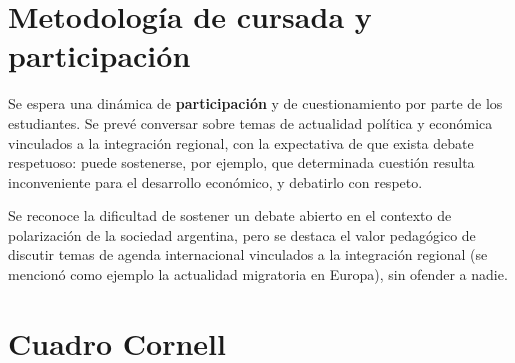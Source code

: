 \documentclass[12pt,oneside]{book}
\begin{document}
\section{Metodología de cursada y participación}

Se espera una dinámica de \textbf{participación} y de cuestionamiento por parte de los estudiantes. Se prevé conversar sobre temas de actualidad política y económica vinculados a la integración regional, con la expectativa de que exista debate respetuoso: puede sostenerse, por ejemplo, que determinada cuestión resulta inconveniente para el desarrollo económico, y debatirlo con respeto.

Se reconoce la dificultad de sostener un debate abierto en el contexto de polarización de la sociedad argentina, pero se destaca el valor pedagógico de discutir temas de agenda internacional vinculados a la integración regional (se mencionó como ejemplo la actualidad migratoria en Europa), sin ofender a nadie.

\section{Cuadro Cornell}
\end{document}
